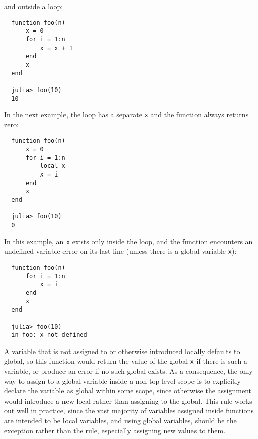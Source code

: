 \documentclass{article}
\begin{document}
and outside a loop:
\begin{verbatim}
  function foo(n)
      x = 0
      for i = 1:n
          x = x + 1
      end
      x
  end
  
  julia> foo(10)
  10
\end{verbatim}
In the next example, the loop has a separate \verb|x| and the function
always returns zero:
\begin{verbatim}
  function foo(n)
      x = 0
      for i = 1:n
          local x
          x = i
      end
      x
  end

  julia> foo(10)
  0
\end{verbatim}
In this example, an \verb|x| exists only inside the loop, and
the function encounters an undefined variable error on its last line
(unless there is a global variable \verb|x|):
\begin{verbatim}
  function foo(n)
      for i = 1:n
          x = i
      end
      x
  end

  julia> foo(10)
  in foo: x not defined
\end{verbatim}
A variable that is not assigned to or otherwise introduced locally defaults to global,
so this function would return the value of the global \verb|x|
if there is such a variable, or produce an error if no such global exists.
As a consequence, the only way to assign to a global variable inside
a non-top-level scope is to explicitly declare the variable as global within some scope, since
otherwise the assignment would introduce a new local rather than assigning to the global. This rule works out
well in practice, since the vast majority of variables assigned inside
functions are intended to be local variables, and using global variables, should be the exception rather than the rule, especially assigning new values to them.
\end{document}
